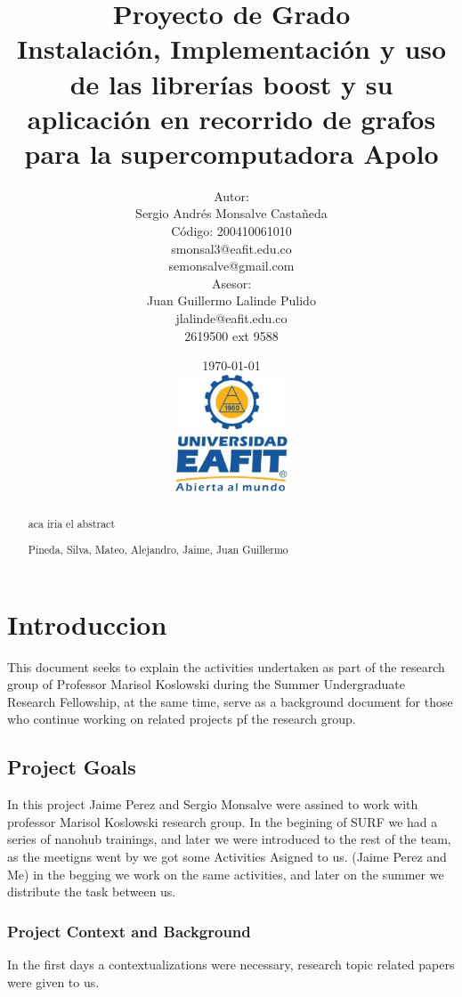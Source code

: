 \documentclass[twoside,letterpaper,12pt]{report}
\title{
Proyecto de Grado\\[0.5cm]
Instalación, Implementación y uso de las librerías boost y su aplicación en recorrido de grafos para la supercomputadora Apolo}
\author{
	Autor:\\[0.3cm]
	Sergio Andrés Monsalve Castañeda\\
	Código: 200410061010\\
	smonsal3@eafit.edu.co\\
	semonsalve@gmail.com\\[0.7cm]
	Asesor: \\[0.3cm]
	Juan Guillermo Lalinde Pulido\\
	jlalinde@eafit.edu.co\\
	2619500 ext 9588\\[1cm]
}
\date{
	\today \\[0.5cm]
	\includegraphics[width=0.25\textwidth]{aux/logo_eafit}
}
\begin{document}
\maketitle

\tableofcontents

\begin{abstract}
 aca iria el abstract
\end{abstract}

\newpage

\renewcommand{\abstractname}{Agradecimientos}
\begin{abstract}
Pineda, Silva, Mateo, Alejandro, Jaime, Juan Guillermo
\end{abstract}

\newpage

\chapter{Introduccion}

This document seeks to explain the activities undertaken as part of the research group of Professor Marisol Koslowski during the Summer Undergraduate Research Fellowship, at the same time, serve as a background document for those who continue working on related projects pf the research group.


\section{Project Goals}
	
	In this project Jaime Perez and Sergio Monsalve were assined to work with professor Marisol Koslowski research group. In the begining of SURF we had a series of nanohub trainings, and later we were introduced to the rest of the team, as the meetigns went by we got some Activities Asigned to us. (Jaime Perez and Me) in the begging we work on the same activities, and later on the summer we distribute the task between us. 

	\subsection {Project Context and Background}

	In the first days a contextualizations were necessary, research topic related papers were given to us. 
\end{document}
